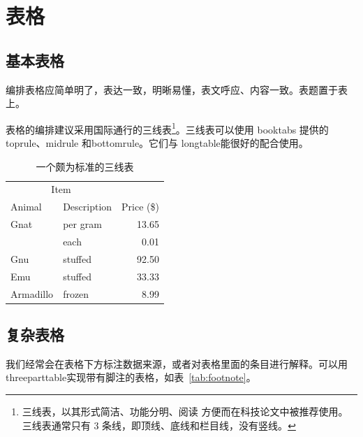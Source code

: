 \section{表格}

\subsection{基本表格}

编排表格应简单明了，表达一致，明晰易懂，表文呼应、内容一致。表题置于表上。

表格的编排建议采用国际通行的三线表\footnote{三线表，以其形式简洁、功能分明、阅读
方便而在科技论文中被推荐使用。三线表通常只有 3 条线，即顶线、底线和栏目线，没有竖线。}。三线表可以使用 booktabs 提供的 toprule、midrule 和bottomrule。它们与 longtable能很好的配合使用。

\begin{table}[!hpt]
  \caption[一个颇为标准的三线表]{一个颇为标准的三线表\footnotemark}
  \label{tab:firstone}
  \centering
  \begin{tabular}{@{}llr@{}} \toprule
    \multicolumn{2}{c}{Item} \\ \cmidrule(r){1-2}
    Animal & Description & Price (\$)\\ \midrule
    Gnat  & per gram  & 13.65 \\
          & each      & 0.01 \\
    Gnu   & stuffed   & 92.50 \\
    Emu   & stuffed   & 33.33 \\
    Armadillo & frozen & 8.99 \\ \bottomrule
  \end{tabular}
\end{table}
\subsection{复杂表格}

我们经常会在表格下方标注数据来源，或者对表格里面的条目进行解释。可以用threeparttable实现带有脚注的表格，如表~\ref{tab:footnote}。

